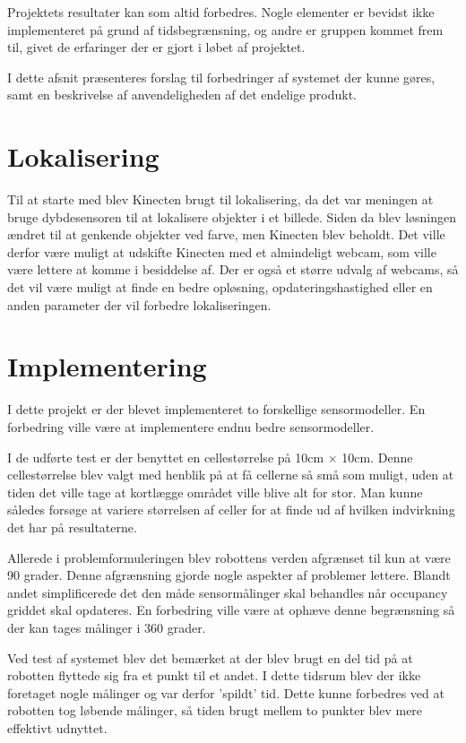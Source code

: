 Projektets resultater kan som altid forbedres.
Nogle elementer er bevidst ikke implementeret på grund af tidsbegrænsning, og andre er gruppen kommet frem til, givet de erfaringer der er gjort i løbet af projektet.

I dette afsnit præsenteres forslag til forbedringer af systemet der kunne gøres, samt en beskrivelse af anvendeligheden af det endelige produkt.

\section{Lokalisering}
Til at starte med blev Kinecten brugt til lokalisering, da det var meningen at bruge dybdesensoren til at lokalisere objekter i et billede.
Siden da blev løsningen ændret til at genkende objekter ved farve, men Kinecten blev beholdt.
Det ville derfor være muligt at udskifte Kinecten med et almindeligt webcam, som ville være lettere at komme i besiddelse af. 
Der er også et større udvalg af webcams, så det vil være muligt at finde en bedre opløsning, opdateringshastighed eller en anden parameter der vil forbedre lokaliseringen.

\section{Implementering}
I dette projekt er der blevet implementeret to forskellige sensormodeller. 
En forbedring ville være at implementere endnu bedre sensormodeller.

I de udførte test er der benyttet en cellestørrelse på 10cm $ \times $ 10cm.
Denne cellestørrelse blev valgt med henblik på at få cellerne så små som muligt, uden at tiden det ville tage at kortlægge området ville blive alt for stor.
Man kunne således forsøge at variere størrelsen af celler for at finde ud af hvilken indvirkning det har på resultaterne.

Allerede i problemformuleringen blev robottens verden afgrænset til kun at være 90 grader. 
Denne afgrænsning gjorde nogle aspekter af problemer lettere. 
Blandt andet simplificerede det den måde sensormålinger skal behandles når occupancy griddet skal opdateres.
En forbedring ville være at ophæve denne begrænsning så der kan tages målinger i 360 grader.

Ved test af systemet blev det bemærket at der blev brugt en del tid på at robotten flyttede sig fra et punkt til et andet.
I dette tidsrum blev der ikke foretaget nogle målinger og var derfor 'spildt' tid. 
Dette kunne forbedres ved at robotten tog løbende målinger, så tiden brugt mellem to punkter blev mere effektivt udnyttet.


